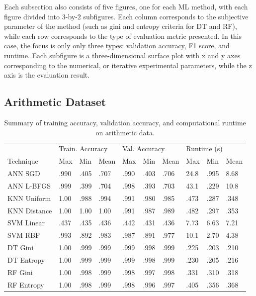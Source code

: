 \documentclass[12pt]{uthesis-v12}  %
\begin{document}
Each subsection also consists of five figures, one for each ML method, with each figure divided into 3-by-2 subfigures. Each column corresponds to the subjective parameter of the method (such as gini and entropy criteria for DT and RF), while each row corresponds to the type of evaluation metric presented. In this case, the focus is only only three types: validation accuracy, F1 score, and runtime. Each subfigure is a three-dimensional surface plot with x and y axes corresponding to the numerical, or iterative experimental parameters, while the z axis is the evaluation result.

\subsection{Arithmetic Dataset}

\begin{table}[!t]
\caption{Summary of training accuracy, validation accuracy, and computational runtime on arithmetic data.}
\renewcommand{\arraystretch}{1.3}
\centering
{\begin{tabular}{*{10}{l}}
\toprule
& \multicolumn{3}{l}{Train. Accuracy} & \multicolumn{3}{l}{Val. Accuracy} & \multicolumn{3}{l}{Runtime (s)} \\
Technique & Max & Min & Mean & Max & Min & Mean & Max & Min & Mean \\ \midrule
ANN SGD & .990 & .405 & .707 & .990 & .403 & .706 & 24.8 & .995 & 8.68 \\
ANN L-BFGS & .999 & .399 & .704 & .998 & .393 & .703 & 43.1 & .229 & 10.8 \\
KNN Uniform & 1.00 & .988 & .994 & .991 & .980 & .985 & .473 & .287 & .348 \\
KNN Distance & 1.00 & 1.00 & 1.00 & .991 & .987 & .989 & .482 & .297 & .353 \\
SVM Linear & .437 & .435 & .436 & .442 & .431 & .436 & 7.73 & 6.63 & 7.21 \\
SVM RBF & .993 & .892 & .983 & .987 & .891 & .977 & 10.1 & 2.70 & 4.38 \\
DT Gini & 1.00 & .999 & .999 & .999 & .998 & .999 & .225 & .203 & .210 \\
DT Entropy & 1.00 & .999 & .999 & .999 & .998 & .999 & .230 & .205 & .216 \\
RF Gini & 1.00 & .998 & .999 & .998 & .997 & .998 & .331 & .310 & .318 \\
RF Entropy & 1.00 & .998 & .999 & .998 & .996 & .997 & .405 & .356 & .368 \\ \bottomrule
\end{tabular}}

\label{tvr-nata}
\end{table}
\end{document}
